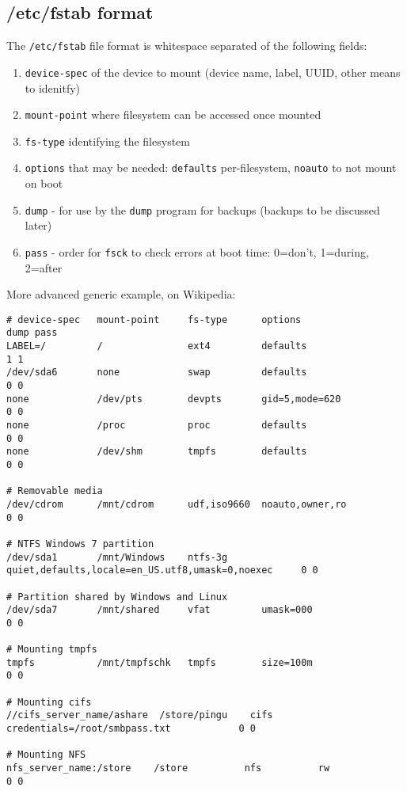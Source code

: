 \documentclass[slides]{pgnotes}
\begin{document}
\newpage
\subsection{/etc/fstab format}

The \texttt{/etc/fstab} file format is whitespace separated of the following fields:

\begin{enumerate}
\def\labelenumi{\arabic{enumi}.}
\item
  \texttt{device-spec} of the device to mount (device name, label, UUID,
  other means to idenitfy)
\item
  \texttt{mount-point} where filesystem can be accessed once mounted
\item
  \texttt{fs-type} identifying the filesystem
\item
  \texttt{options} that may be needed: \texttt{defaults} per-filesystem,
  \texttt{noauto} to not mount on boot
\item
  \texttt{dump} - for use by the \texttt{dump} program for backups
  (backups to be discussed later)
\item
  \texttt{pass} - order for \texttt{fsck} to check errors at boot time:
  0=don't, 1=during, 2=after
\end{enumerate}

\newpage
More advanced generic example, on Wikipedia:

\begin{verbatim}
# device-spec   mount-point     fs-type      options                                          dump pass
LABEL=/         /               ext4         defaults                                            1 1
/dev/sda6       none            swap         defaults                                            0 0
none            /dev/pts        devpts       gid=5,mode=620                                      0 0
none            /proc           proc         defaults                                            0 0
none            /dev/shm        tmpfs        defaults                                            0 0

# Removable media
/dev/cdrom      /mnt/cdrom      udf,iso9660  noauto,owner,ro                                     0 0

# NTFS Windows 7 partition
/dev/sda1       /mnt/Windows    ntfs-3g      quiet,defaults,locale=en_US.utf8,umask=0,noexec     0 0

# Partition shared by Windows and Linux
/dev/sda7       /mnt/shared     vfat         umask=000                                           0 0

# Mounting tmpfs
tmpfs           /mnt/tmpfschk   tmpfs        size=100m                                           0 0

# Mounting cifs
//cifs_server_name/ashare  /store/pingu    cifs         credentials=/root/smbpass.txt            0 0

# Mounting NFS
nfs_server_name:/store    /store          nfs          rw                                        0 0
\end{verbatim}
\end{document}
